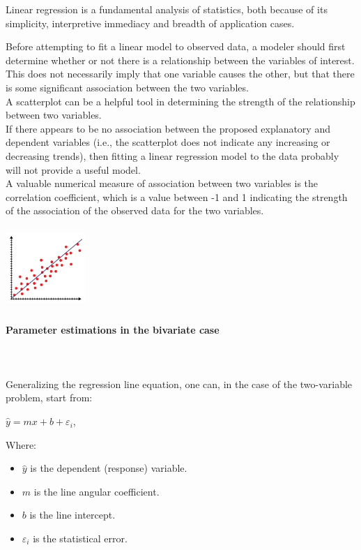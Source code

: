 \documentclass{article}
\begin{document}
Linear regression is a fundamental analysis of statistics, both because of its simplicity, interpretive immediacy and breadth of application cases.

Before attempting to fit a linear model to observed data, a modeler should first determine whether or not there is a relationship between the variables of interest. This does not necessarily imply that one variable causes the other, but that there is some significant association between the two variables. \\
A scatterplot can be a helpful tool in determining the strength of the relationship between two variables. \\
If there appears to be no association between the proposed explanatory and dependent variables (i.e., the scatterplot does not indicate any increasing or decreasing trends), then fitting a linear regression model to the data probably will not provide a useful model. \\ 
A valuable numerical measure of association between two variables is the correlation coefficient, which is a value between -1 and 1 indicating the strength of the association of the observed data for the two variables.

\includegraphics[width=3cm, height=3cm]{regression_chart}

\paragraph{Parameter estimations in the bivariate case}\mbox{} \\
\mbox{} \\
Generalizing the regression line equation, one can, in the case of the two-variable problem, start from:

$\hat{y} = mx + b +\varepsilon_{i}$,

Where:
\begin{itemize}
    \item $\hat{y}$ is the dependent (response) variable.
    \item $m$ is the line angular coefficient.
    \item $b$ is the line intercept.
    \item $\varepsilon_{i}$ is the statistical error.
\end{itemize}
\end{document}

